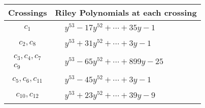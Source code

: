 \documentclass[1p]{elsarticle_modified}
\theoremstyle{definition}
\begin{document}
\begin{tabular}{m{50pt}|m{274pt}}
Crossings & \hspace{64pt}Riley Polynomials at each crossing \\
\hline $$\begin{aligned}c_{1}\end{aligned}$$&$\begin{aligned}
&y^{53}-17 y^{52}+\cdots+35 y-1
\end{aligned}$\\
\hline $$\begin{aligned}c_{2},c_{8}\end{aligned}$$&$\begin{aligned}
&y^{53}+31 y^{52}+\cdots+3 y-1
\end{aligned}$\\
\hline $$\begin{aligned}c_{3},c_{4},c_{7}\\c_{9}\end{aligned}$$&$\begin{aligned}
&y^{53}-65 y^{52}+\cdots+899 y-25
\end{aligned}$\\
\hline $$\begin{aligned}c_{5},c_{6},c_{11}\end{aligned}$$&$\begin{aligned}
&y^{53}-45 y^{52}+\cdots+3 y-1
\end{aligned}$\\
\hline $$\begin{aligned}c_{10},c_{12}\end{aligned}$$&$\begin{aligned}
&y^{53}+23 y^{52}+\cdots+39 y-9
\end{aligned}$\\
\hline
\end{tabular}
\vskip 2pc
\end{document}

